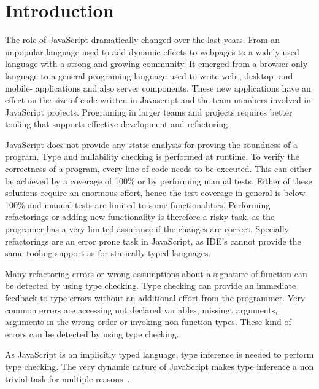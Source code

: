 \section{Introduction}
The role of JavaScript dramatically changed over the last years. From an unpopular language used to add dynamic effects to webpages to a widely used language with a strong and growing community. It emerged from a browser only language to a general programing language used to write web-,  desktop- and mobile- applications and also server components. These new applications have an effect on the size of code written in Javascript and the team members involved in JavaScript projects. Programing in larger teams and projects requires better tooling that supports effective development and refactoring. 

JavaScript does not provide any static analysis for proving the soundness of a program. Type and nullability checking is performed at runtime. To verify the correctness of a program, every line of code needs to be executed. This can either be achieved by a coverage of 100\% or by performing manual tests. Either of these solutions require an enormous effort, hence the test coverage in general is below 100\% and manual tests are limited to some functionalities. Performing refactorings or adding new functionality is therefore a risky task, as the programer has a very limited assurance if the changes are correct. Specially refactorings are an error prone task in JavaScript, as IDE's cannot provide the same tooling support as for statically typed languages. 

Many refactoring errors or wrong assumptions about a signature of function can be detected by using type checking. Type checking can provide an immediate feedback to type errors without an additional effort from the programmer. Very common errors are accessing not declared variables, missingt arguments, arguments in the wrong order or invoking non function types. These kind of errors can be detected by using type checking. 

As JavaScript is an implicitly typed language, type inference is needed to perform type checking. The very dynamic nature of JavaScript makes type inference a non trivial task for multiple reasons~\cite{JensenMollerThiemann2009}. 

